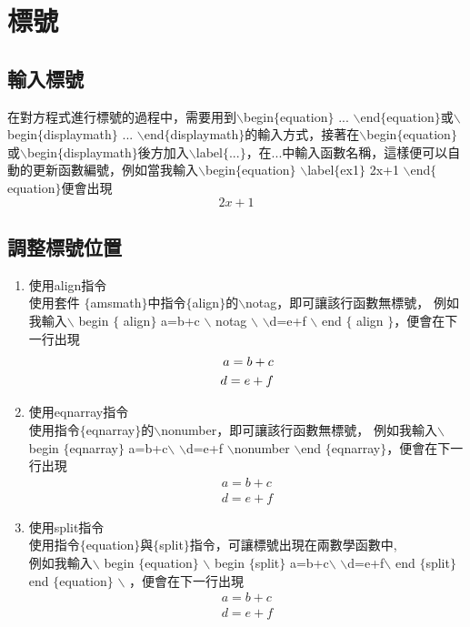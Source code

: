 \section{標號}
\subsection{輸入標號}
在對方程式進行標號的過程中，需要用到$\backslash$begin$\{$equation$\}$ ... $\backslash$end$\{$equation$\}$或$\backslash$begin$\{$displaymath$\}$ ... $\backslash$end$\{$displaymath$\}$的輸入方式，接著在$\backslash$begin$\{$equation$\}$或$\backslash$begin$\{$displaymath$\}$後方加入$\backslash$label$\{$...$\}$，在...中輸入函數名稱，這樣便可以自動的更新函數編號，例如當我輸入$\backslash$begin$\{$equation$\}$ $\backslash$label$\{$ex1$\}$ 2x+1 $\backslash$end$\{$equation$\}$便會出現\begin{equation}\label{ex1}
2x+1
\end{equation}
\subsection{調整標號位置}
\begin{enumerate}
\color{coolblack}
\item 使用align指令\\
\colorbox{bananamania}{\textcolor{coolblack}{使用套件 $\{$amsmath$\}$中指令$\{$align$\}$的$\backslash$notag，即可讓該行函數無標號，}}
例如我輸入$\backslash$ begin $\{$ align$\}$ a=b+c $\backslash$ notag $\backslash$ $\backslash$d=e+f $\backslash$ end $\{$ align $\}$，便會在下一行出現\begin{align} a=b+c\notag\\ d=e+f 
\end{align}
\item 使用eqnarray指令\\
使用指令$\{$eqnarray$\}$的$\backslash$nonumber，即可讓該行函數無標號，
例如我輸入$\backslash$ begin $\{$eqnarray$\}$ a=b+c$\backslash$ $\backslash$d=e+f $\backslash$nonumber $\backslash$end $\{$eqnarray$\}$，便會在下一行出現\begin{eqnarray} a=b+c\\ d=e+f\nonumber
\end{eqnarray}
\item 使用split指令\\
使用指令$\{$equation$\}$與$\{$split$\}$指令，可讓標號出現在兩數學函數中,\\
例如我輸入$\backslash$ begin $\{$equation$\}$ $\backslash$ begin $\{$split$\}$ a=b+c$\backslash$ $\backslash$d=e+f$\backslash$ end $\{$split$\}$end $\{$equation$\}$ $\backslash$ ，便會在下一行出現\begin{equation}
\begin{split}
a=b+c\\ d=e+f
\end{split}
\end{equation}
\end{enumerate}

